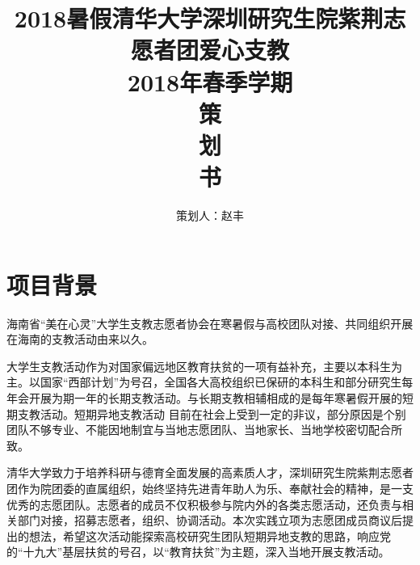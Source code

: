 \documentclass[12pt]{ctexart}
\begin{document}
\title{
    \vspace{-0.5in}
    \textmd{\textbf{\huge{2018暑假清华大学深圳研究生院紫荆志愿者团爱心支教}}}\\
    \normalsize\vspace{0.1in}\Large{2018年春季学期}\\
    \vspace{1in}
     \textbf{\huge{策}}\\
    \vspace{1in}
     \textbf{\huge{划}}\\
    \vspace{1in}
     \textbf{\huge{书}}\\
    \vspace{1in}
}
\author{策划人：赵丰}
\maketitle
\thispagestyle{empty}
\pagebreak
\pagestyle{runningpage}

\section{项目背景}
海南省“美在心灵”大学生支教志愿者协会在寒暑假与高校团队对接、共同组织开展在海南的支教活动由来以久。

大学生支教活动作为对国家偏远地区教育扶贫的一项有益补充，主要以本科生为主。以国家“西部计划”为号召，全国各大高校组织已保研的本科生和部分研究生每年会开展为期一年的长期支教活动。与长期支教相辅相成的是每年寒暑假开展的短期支教活动。短期异地支教活动
目前在社会上受到一定的非议，部分原因是个别团队不够专业、不能因地制宜与当地志愿团队、当地家长、当地学校密切配合所致。

清华大学致力于培养科研与德育全面发展的高素质人才，深圳研究生院紫荆志愿者团作为院团委的直属组织，始终坚持先进青年助人为乐、奉献社会的精神，是一支优秀的志愿团队。志愿者的成员不仅积极参与院内外的各类志愿活动，还负责与相关部门对接，招募志愿者，组织、协调活动。本次实践立项为志愿团成员商议后提出的想法，希望这次活动能探索高校研究生团队短期异地支教的思路，响应党的“十九大”基层扶贫的号召，以“教育扶贫”为主题，深入当地开展支教活动。
\end{document}
